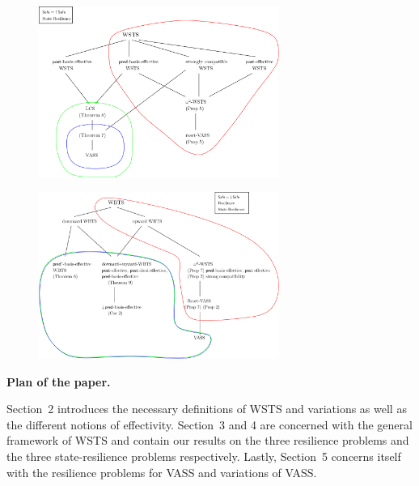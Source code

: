\documentclass[runningheads]{llncs}
\newcommand{\alain}[1]{\todo[inline,color=red!20]{{\bf AF:} #1}}
\begin{document}
 \begin{center}
	\begin{figure}
\includegraphics[width=0.70\textwidth]{Safe_up_State_R}
	\end{figure}
\end{center}

 \begin{center}
	\begin{figure}
\includegraphics[width=0.70\textwidth]{Safe_down_R}
	\end{figure}
\end{center}
\fi



\noindent
{\bf Plan of the paper.} 

Section~2 introduces the necessary definitions of WSTS and variations as well as the different notions of effectivity. Section~3 and 4 are concerned with the general framework of WSTS and contain our results on the three resilience problems
and the three state-resilience problems respectively. Lastly, Section~5 concerns itself with the resilience problems for VASS and variations of VASS.
\end{document}
